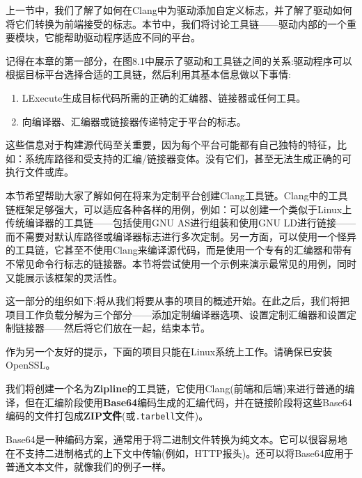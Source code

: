 
上一节中，我们了解了如何在Clang中为驱动添加自定义标志，并了解了驱动如何将它们转换为前端接受的标志。本节中，我们将讨论工具链——驱动内部的一个重要模块，它能帮助驱动程序适应不同的平台。

记得在本章的第一部分，在图8.1中展示了驱动和工具链之间的关系:驱动程序可以根据目标平台选择合适的工具链，然后利用其基本信息做以下事情:

\begin{enumerate}
\item LExecute生成目标代码所需的正确的汇编器、链接器或任何工具。

\item 向编译器、汇编器或链接器传递特定于平台的标志。
\end{enumerate}

这些信息对于构建源代码至关重要，因为每个平台可能都有自己独特的特征，比如：系统库路径和受支持的汇编/链接器变体。没有它们，甚至无法生成正确的可执行文件或库。

本节希望帮助大家了解如何在将来为定制平台创建Clang工具链。Clang中的工具链框架足够强大，可以适应各种各样的用例，例如：可以创建一个类似于Linux上传统编译器的工具链——包括使用GNU AS进行组装和使用GNU LD进行链接——而不需要对默认库路径或编译器标志进行多次定制。另一方面，可以使用一个怪异的工具链，它甚至不使用Clang来编译源代码，而是使用一个专有的汇编器和带有不常见命令行标志的链接器。本节将尝试使用一个示例来演示最常见的用例，同时又能展示该框架的灵活性。

这一部分的组织如下:将从我们将要从事的项目的概述开始。在此之后，我们将把项目工作负载分解为三个部分——添加定制编译器选项、设置定制汇编器和设置定制链接器——然后将它们放在一起，结束本节。

\begin{tcolorbox}[colback=blue!5!white,colframe=blue!75!black, fonttitle=\bfseries,title=系统需求]	
\hspace*{0.7cm}作为另一个友好的提示，下面的项目只能在Linux系统上工作。请确保已安装OpenSSL。
\end{tcolorbox}


我们将创建一个名为\textbf{Zipline}的工具链，它使用Clang(前端和后端)来进行普通的编译，但在汇编阶段使用\textbf{Base64}编码生成的汇编代码，并在链接阶段将这些Base64编码的文件打包成\textbf{ZIP文件}(或\texttt{.tarbell}文件)。

\begin{tcolorbox}[colback=blue!5!white,colframe=blue!75!black, fonttitle=\bfseries,title=Base64]	
\hspace*{0.7cm}Base64是一种编码方案，通常用于将二进制文件转换为纯文本。它可以很容易地在不支持二进制格式的上下文中传输(例如，HTTP报头)。还可以将Base64应用于普通文本文件，就像我们的例子一样。
\end{tcolorbox}

